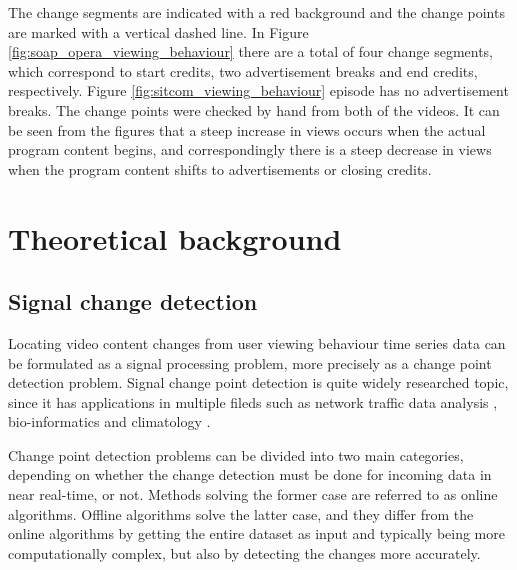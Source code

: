 The change segments are indicated with a red background and the change points are marked with a vertical dashed line. In Figure \ref{fig:soap_opera_viewing_behaviour} there are a total of four change segments, which correspond to start credits, two advertisement breaks and end credits, respectively. Figure \ref{fig:sitcom_viewing_behaviour} episode has no advertisement breaks. The change points were checked by hand from both of the videos. It can be seen from the figures that a steep increase in views occurs when the actual program content begins, and correspondingly there is a steep decrease in views when the program content shifts to advertisements or closing credits.

\newpage
\section{Theoretical background} \label{sec:background}

\subsection{Signal change detection} \label{subsec:methods} %


Locating video content changes from user viewing behaviour time series data can be formulated as a signal processing problem, more precisely as a change point detection problem. Signal change point detection is quite widely researched topic, since it has applications in multiple fileds such as network traffic data analysis \cite{levy-leducDetectionLocalizationChangepoints2009} \cite{lung-yut-fongDistributedDetectionLocalization2012}, bio-informatics \cite{liuChangepointDetectionMethod2018} \cite{vertFastDetectionMultiple2010} and climatology \cite{reevesReviewComparisonChangepoint2007} \cite{verbesseltDetectingTrendSeasonal2010a}.

Change point detection problems can be divided into two main categories, depending on whether the change detection must be done for incoming data in near real-time, or not. Methods solving the former case are referred to as online algorithms. Offline algorithms solve the latter case, and they differ from the online algorithms by getting the entire dataset as input and typically being more computationally complex, but also by detecting the changes more accurately.

